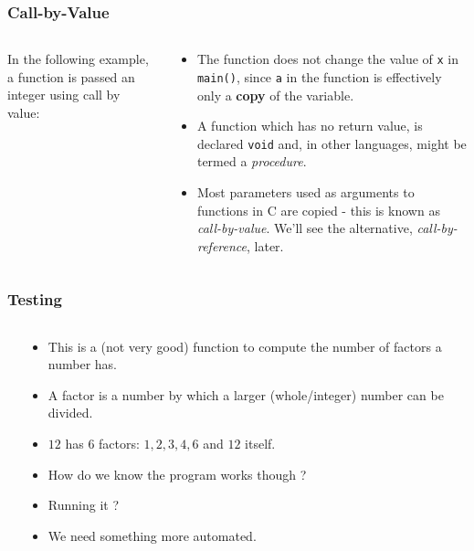 \begin{frame}[fragile]
\frametitle{Call-by-Value}

\begin{columns}

\begin{column}{0.45\textwidth}
In the following example, a function is passed an integer
using call by value:

\end{column}

\pause
\begin{column}{0.45\textwidth}
\begin{itemize}[<+->]
\item The function does not change the value of \verb^x^ in
\verb^main()^, since {\tt a} in the function is effectively
only a {\bf copy} of the variable.
\item A function which has no return value, is declared \verb^void^
and, in other languages, might be termed a {\it procedure}.
\item Most parameters used as arguments to functions in C are copied - this is known as {\it call-by-value}. We'll see the alternative, {\it call-by-reference}, later.
\end{itemize}
\end{column}

\end{columns}
\end{frame}



\begin{frame}[fragile]
\frametitle{Testing}
\begin{columns}

\begin{column}{0.40\textwidth}

\end{column}

\pause
\begin{column}{0.50\textwidth}
\begin{itemize}[<+->]
\item This is a (not very good) function to compute the number of factors a number has.
\item A factor is a number by which a larger (whole/integer) number can be divided.
\item $12$ has $6$ factors: $1, 2, 3, 4, 6$ and $12$ itself.
\item How do we know the program works though ?
\item Running it ? 
\item We need something more automated.
\end{itemize}
\end{column}

\end{columns}
\end{frame}

